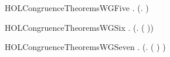 \newcommand{\HOLCongruenceTheoremsWGFour}{\UseVerbatim{HOLCongruenceTheoremsWGFour}}
\begin{SaveVerbatim}{HOLCongruenceTheoremsWGFive}
\HOLTokenTurnstile{} \HOLSymConst{\HOLTokenForall{}} .   \HOLSymConst{\HOLTokenConj{}}   \HOLSymConst{\HOLTokenImp{}}  (\HOLTokenLambda{}.   \HOLSymConst{\ensuremath{\parallel}}  )
\end{SaveVerbatim}
\newcommand{\HOLCongruenceTheoremsWGFive}{\UseVerbatim{HOLCongruenceTheoremsWGFive}}
\begin{SaveVerbatim}{HOLCongruenceTheoremsWGSix}
\HOLTokenTurnstile{} \HOLSymConst{\HOLTokenForall{}} .   \HOLSymConst{\HOLTokenImp{}}  (\HOLTokenLambda{}. \HOLConst{\ensuremath{\nu}}  ( ))
\end{SaveVerbatim}
\newcommand{\HOLCongruenceTheoremsWGSix}{\UseVerbatim{HOLCongruenceTheoremsWGSix}}
\begin{SaveVerbatim}{HOLCongruenceTheoremsWGSeven}
\HOLTokenTurnstile{} \HOLSymConst{\HOLTokenForall{}} .   \HOLSymConst{\HOLTokenImp{}}  (\HOLTokenLambda{}.  ( ) )
\end{SaveVerbatim}
\newcommand{\HOLCongruenceTheoremsWGSeven}{\UseVerbatim{HOLCongruenceTheoremsWGSeven}}
